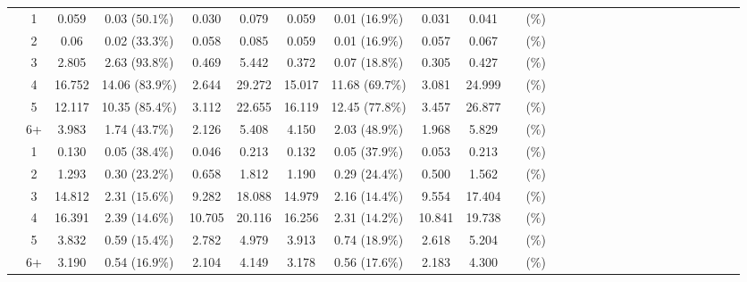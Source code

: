 \documentclass[a4paper 12pt]{article}
\numberwithin{equation}{section}
\begin{document}
\begin{tiny}
\begin{table}[h!]
\begin{tabular}{ccccccccccccccccccccccccccc}
\raisebox{1.5ex}{\bf saithe 2018 Q1}  & 1& 0.059 &0.03 ($50.1 \%$) & 0.030 & 0.079  & 0.059 &0.01 ($16.9 \%$) &0.031 &0.041 &  &  ($ \%$) \\[1ex]
& 2  & 0.06   & 0.02 ($33.3 \%$) &0.058 &0.085  &0.059  &0.01   ($16.9 \%$) &0.057 &0.067 & &  ($ \%$) \\[1ex]
& 3  & 2.805  & 2.63 ($93.8 \%$) &0.469 & 5.442 &0.372  &0.07   ($18.8 \%$) &0.305 &0.427 & &  ($ \%$) \\[1ex]
& 4  & 16.752 &14.06 ($83.9 \%$) &2.644 &29.272 &15.017 &11.68  ($69.7 \%$) &3.081 &24.999 & &  ($ \%$) \\[1ex]
& 5  & 12.117 &10.35 ($85.4 \%$) &3.112 &22.655 &16.119 &12.45 ($77.8 \%$) &3.457 &26.877 & &  ($ \%$) \\[1ex]
& 6+ & 3.983  &1.74  ($43.7 \%$) &2.126 & 5.408 &4.150  &2.03  ($48.9 \%$)  &1.968 &5.829 & &  ($ \%$)\\[4.5ex]


\raisebox{1.5ex}{\bf saithe 2017 Q3} & 1  & 0.130   & 0.05 ($38.4 \%$) &0.046 &0.213  &0.132  &0.05   ($37.9 \%$) &0.053 &0.213 & &  ($ \%$) \\[1ex]
& 2  & 1.293  & 0.30 ($23.2 \%$) &0.658 & 1.812 &1.190  &0.29   ($24.4 \%$) &0.500 &1.562 & &  ($ \%$) \\[1ex]
& 3  & 14.812 & 2.31 ($15.6 \%$) &9.282 &18.088 &14.979 &2.16  ($14.4 \%$) &9.554 &17.404 & &  ($ \%$) \\[1ex]
& 4  & 16.391 &2.39 ($14.6 \%$) &10.705 &20.116 &16.256 &2.31 ($14.2 \%$) &10.841 &19.738 & &  ($ \%$) \\[1ex]
& 5 & 3.832  &0.59  ($15.4 \%$) &2.782 & 4.979 &3.913  &0.74  ($18.9 \%$)  &2.618 &5.204 & &  ($ \%$)\\[1ex]
& 6+ & 3.190  &0.54  ($16.9 \%$) &2.104 & 4.149 &3.178  &0.56  ($17.6 \%$)  &2.183 &4.300 & &  ($ \%$)\\[0.5ex]

\hline
\end{tabular}
\end{table}
\end{tiny}


\end{document}
